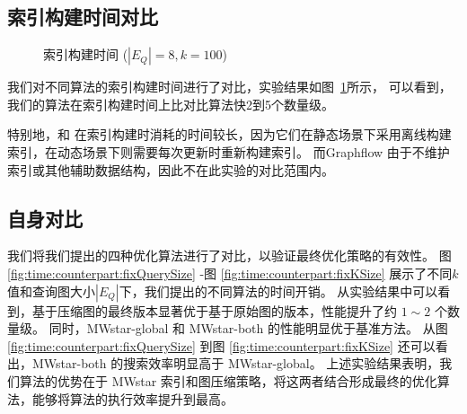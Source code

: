 \subsection{索引构建时间对比}
\label{ch5:index-construction}
\begin{figure}[h!]
    \centering
    \caption{索引构建时间  ($|E_Q|=8, k=100$)}
    \label{fig:exp:time:index}
\end{figure}    
我们对不同算法的索引构建时间进行了对比，实验结果如图~\ref{fig:exp:time:index}所示，
可以看到，我们的算法在索引构建时间上比对比算法快2到5个数量级。

特别地，\pm 和 \itk 在索引构建时消耗的时间较长，因为它们在静态场景下采用离线构建索引，在动态场景下则需要每次更新时重新构建索引。
而Graphflow 由于不维护索引或其他辅助数据结构，因此不在此实验的对比范围内。


\subsection{自身对比}
\label{ch5:couterparts}




\label{sec:couterparts}
我们将我们提出的四种优化算法进行了对比，以验证最终优化策略的有效性。
图 \ref{fig:time:counterpart:fixQuerySize} -图 \ref{fig:time:counterpart:fixKSize} 展示了不同$k$值和查询图大小$|E_Q|$下，我们提出的不同算法的时间开销。
从实验结果中可以看到，基于压缩图的最终版本显著优于基于原始图的版本，性能提升了约 $1{\sim}2$ 个数量级。
同时，MWstar-global 和 MWstar-both 的性能明显优于基准方法。
从图 \ref{fig:time:counterpart:fixQuerySize} 到图 \ref{fig:time:counterpart:fixKSize} 还可以看出，MWstar-both 的搜索效率明显高于 MWstar-global。
上述实验结果表明，我们算法的优势在于 MWstar 索引和图压缩策略，将这两者结合形成最终的优化算法，能够将算法的执行效率提升到最高。

